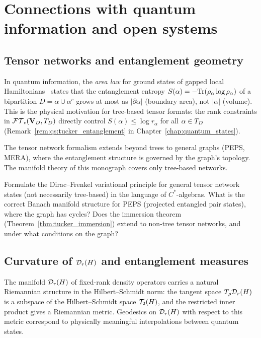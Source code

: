 \section{Connections with quantum information and open systems}
\label{sec:open:quantum}

\subsection*{Tensor networks and entanglement geometry}

In quantum information, the \emph{area law} for ground states of
gapped local Hamiltonians~\cite{Vidal2003} states that the entanglement
entropy $S(\alpha) = -\mathrm{Tr}(\rho_\alpha \log \rho_\alpha)$ of a bipartition
$D = \alpha \cup \alpha^c$ grows at most as $|\partial\alpha|$ (boundary
area), not $|\alpha|$ (volume). This is the physical motivation for
tree-based tensor formats: the rank constraints in $\mathcal{FT}_{\mathfrak{r}}(\mathbf{V}_D,T_D)$ directly
control $S(\alpha) \leq \log r_\alpha$ for all $\alpha \in T_D$
(Remark~\ref{rem:qs:tucker_entanglement} in
Chapter~\ref{chap:quantum_states}).

The tensor network formalism extends beyond trees to general graphs
(PEPS, MERA), where the entanglement structure is governed by the
graph's topology. The manifold theory of this monograph covers only
tree-based networks.

\begin{problem}
\label{prob:quantum}
Formulate the Dirac--Frenkel variational principle for general tensor
network states (not necessarily tree-based) in the language of
$C^*$-algebras. What is the correct Banach manifold structure for
PEPS (projected entangled pair states), where the graph has cycles?
Does the immersion theorem (Theorem~\ref{thm:tucker_immersion}) extend
to non-tree tensor networks, and under what conditions on the graph?
\end{problem}

\subsection*{Curvature of $\mathcal{D}_{r}(H)$ and entanglement measures}

The manifold $\mathcal{D}_{r}(H)$ of fixed-rank density operators carries a
natural Riemannian structure in the Hilbert--Schmidt norm: the tangent
space $T_\rho \mathcal{D}_{r}(H)$ is a subspace of the Hilbert--Schmidt space
$\mathcal{T}_{2}(H)$, and the restricted inner product gives a Riemannian metric.
Geodesics on $\mathcal{D}_{r}(H)$ with respect to this metric correspond to
physically meaningful interpolations between quantum states.

